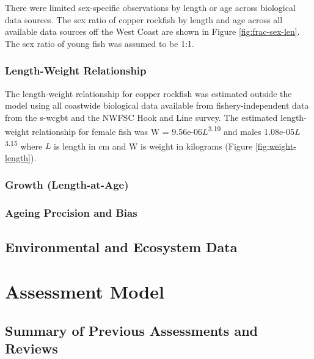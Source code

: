 \documentclass[11pt,
  english,
  letterpaper,
]{article}
\begin{document}
\hfill\break

There were limited sex-specific observations by length or age across biological data sources. The sex ratio of copper rockfish by length and age across all available data sources off the West Coast are shown in Figure \ref{fig:frac-sex-len}. The sex ratio of young fish was assumed to be 1:1.

\hypertarget{length-weight-relationship}{%
\subsubsection{Length-Weight Relationship}\label{length-weight-relationship}}

\hfill\break

The length-weight relationship for copper rockfish was estimated outside the model using all coastwide biological data available from fishery-independent data from the \gls{s-wcgbt} and the NWFSC Hook and Line survey. The estimated length-weight relationship for female fish was W = 9.56e-06\(L\)\textsuperscript{3.19} and males 1.08e-05\(L\)\textsuperscript{3.15} where \(L\) is length in cm and W is weight in kilograms (Figure \ref{fig:weight-length}).

\hypertarget{growth-length-at-age}{%
\subsubsection{Growth (Length-at-Age)}\label{growth-length-at-age}}

\hypertarget{ageing-precision-and-bias}{%
\subsubsection{Ageing Precision and Bias}\label{ageing-precision-and-bias}}

\hypertarget{environmental-and-ecosystem-data}{%
\subsection{Environmental and Ecosystem Data}\label{environmental-and-ecosystem-data}}

\hypertarget{assessment-model}{%
\section{Assessment Model}\label{assessment-model}}

\hypertarget{summary-of-previous-assessments-and-reviews}{%
\subsection{Summary of Previous Assessments and Reviews}\label{summary-of-previous-assessments-and-reviews}}
\end{document}
